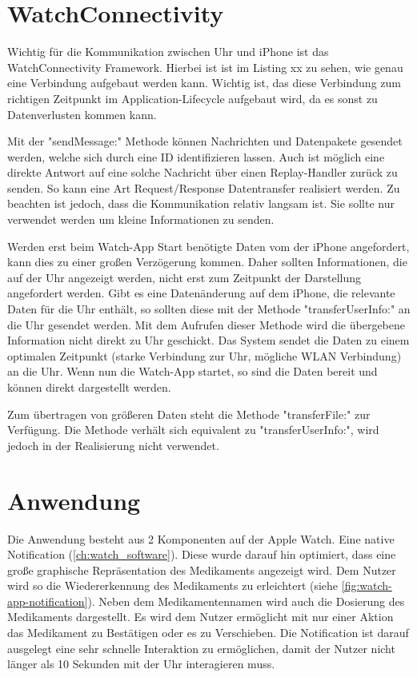 \section{WatchConnectivity}
Wichtig für die Kommunikation zwischen Uhr und iPhone ist das WatchConnectivity Framework. Hierbei ist ist im Listing xx zu sehen, wie genau eine Verbindung aufgebaut werden kann. Wichtig ist, das diese Verbindung zum richtigen Zeitpunkt im Application-Lifecycle aufgebaut wird, da es sonst zu Datenverlusten kommen kann. 

Mit der "sendMessage:" Methode können Nachrichten und Datenpakete gesendet werden, welche sich durch eine ID identifizieren lassen. Auch ist möglich eine direkte Antwort auf eine solche Nachricht über einen Replay-Handler zurück zu senden. So kann eine Art Request/Response Datentransfer realisiert werden. Zu beachten ist jedoch, dass die Kommunikation relativ langsam ist. Sie sollte nur verwendet werden um kleine Informationen zu senden.

Werden erst beim Watch-App Start benötigte Daten vom der iPhone angefordert, kann dies zu einer großen Verzögerung kommen. Daher sollten Informationen, die auf der Uhr angezeigt werden, nicht erst zum Zeitpunkt der Darstellung angefordert werden. Gibt es eine Datenänderung auf dem iPhone, die relevante Daten für die Uhr enthält, so sollten diese mit der Methode "transferUserInfo:" an die Uhr gesendet werden. Mit dem Aufrufen dieser Methode wird die übergebene Information nicht direkt zu Uhr geschickt. Das System sendet die Daten zu einem optimalen Zeitpunkt (starke Verbindung zur Uhr, mögliche WLAN Verbindung) an die Uhr. Wenn nun die Watch-App startet, so sind die Daten bereit und können direkt dargestellt werden.

Zum übertragen von größeren Daten steht die Methode "transferFile:" zur Verfügung. Die Methode verhält sich equivalent zu "transferUserInfo:", wird jedoch in der Realisierung nicht verwendet.

\section{Anwendung}

Die Anwendung besteht aus 2 Komponenten auf der Apple Watch. Eine native Notification (\ref{ch:watch_software}). Diese wurde darauf hin optimiert, dass eine große graphische Repräsentation des Medikaments angezeigt wird. Dem Nutzer wird so die Wiedererkennung des Medikaments zu erleichtert (siehe \ref{fig:watch-app-notification}). Neben dem Medikamentennamen wird auch die Dosierung des Medikaments dargestellt. Es wird dem Nutzer ermöglicht mit nur einer Aktion das Medikament zu Bestätigen oder es zu Verschieben. Die Notification ist darauf ausgelegt eine sehr schnelle Interaktion zu ermöglichen, damit der Nutzer nicht länger als 10 Sekunden mit der Uhr interagieren muss.

